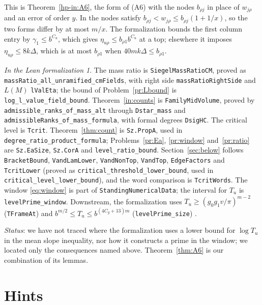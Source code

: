 \documentclass[reqno]{amsart}
\theoremstyle{definition}
\theoremstyle{plain}
\theoremstyle{remark}
\newtheorem*{leanremark}{In the Lean formalization}
\begin{document}
This is Theorem~\ref{hp-in:A6}, the form of (A6) with the nodes
$b_{\rho j}$ in place of $w_{j\rho}$ and an error of order $y$.  In
\cite[\S15.5]{Adr} the nodes satisfy $b_{\rho j}<w_{j\rho}\le
b_{\rho j}(1+1/x)$, so the two forms differ by at most $m/x$.  The
formalization bounds the first column entry by $\gamma_1\le b^{C_u}$, which
gives $\eta_{u\rho}\le b_{\rho1}b^{C_u}$ at a top; elsewhere it imposes
$\eta_{u\rho}\le8k\Delta$, which is at most $b_{\rho1}$ when
$40mk\Delta\le b_{\rho1}$.

\begin{leanremark}\sloppy
The mass ratio is \texttt{SiegelMassRatioCM}, proved as
\texttt{massRatio\_all\_unramified\_cmFields}, with right side
\texttt{massRatioRightSide} and $L(M)$ \texttt{lValEta}; the bound of
Problem~\ref{pr:Lbound} is \texttt{log\_l\_value\_field\_bound}.
Theorem~\ref{in:counts} is \texttt{FamilyMidVolume}, proved by
\texttt{admissible\_ranks\_of\_mass\_alt} through \texttt{Dstar\_mass} and
\texttt{admissibleRanks\_of\_mass\_formula}, with formal degrees
\texttt{DsigHC}.  The critical level is \texttt{Tcrit}.
Theorem~\ref{thm:count} is \texttt{Sz.PropA}, used in
\texttt{degree\_ratio\_product\_formula}; Problems~\ref{pr:Ea},
\ref{pr:window} and~\ref{pr:ratio} are \texttt{Sz.EaSize},
\texttt{Sz.CorA} and \texttt{level\_ratio\_bound}.  Section~\ref{sec:below}
follows \texttt{BracketBound}, \texttt{VandLamLower}, \texttt{VandNonTop},
\texttt{VandTop}, \texttt{EdgeFactors} and \texttt{TcritLower} (proved as
\texttt{critical\_threshold\_lower\_bound}, used in
\texttt{critical\_level\_lower\_bound}), and the word comparison is
\texttt{TcritWords}.  The window \eqref{eq:window} is part of
\texttt{StandingNumericalData}; the interval for $T_u$ is
\texttt{levelPrime\_window}.  Downstream, the formalization uses
$T_u\ge(g_0g_1v/\pi)^{m-2}$ (\texttt{TFrameAt}) and
$b^{m/2}\le T_u\le b^{(4C_g+13)m}$ (\texttt{levelPrime\_size})
\cite{Lean}.
\end{leanremark}

\emph{Status}: we have not traced where the formalization uses a lower
bound for $\log T_u$ in the mean slope inequality, nor how it constructs a
prime in the window; we located only the consequences named above.
Theorem~\ref{thm:A6} is our combination of its lemmas.

\section*{Hints}
\end{document}

